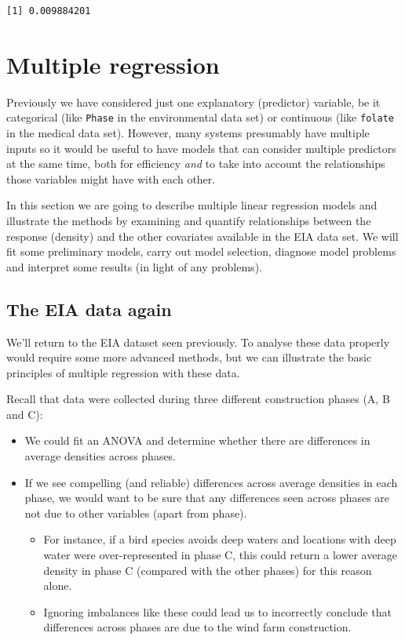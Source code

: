 \documentclass[
  oneside]{krantz}
\begin{document}
\begin{verbatim}
[1] 0.009884201
\end{verbatim}

\hypertarget{multiple-regression}{%
\section{Multiple regression}\label{multiple-regression}}

Previously we have considered just one explanatory (predictor) variable, be it categorical (like \texttt{Phase} in the environmental data set) or continuous (like \texttt{folate} in the medical data set). However, many systems presumably have multiple inputs so it would be useful to have models that can consider multiple predictors at the same time, both for efficiency \emph{and} to take into account the relationships those variables might have with each other.

In this section we are going to describe multiple linear regression models and illustrate the methods by examining and quantify relationships between the response (density) and the other covariates available in the EIA data set.
We will fit some preliminary models, carry out model selection, diagnose model problems and interpret some results (in light of any problems).

\hypertarget{the-eia-data-again}{%
\subsection{The EIA data again}\label{the-eia-data-again}}

We'll return to the EIA dataset seen previously. To analyse these data properly would require some more advanced methods, but we can illustrate the basic principles of multiple regression with these data.

Recall that data were collected during three different construction phases (A, B and C):

\begin{itemize}
\item
  We could fit an ANOVA and determine whether there are differences in average densities across phases.
\item
  If we see compelling (and reliable) differences across average densities in each phase, we would want to be sure that any differences seen across phases are not due to other variables (apart from phase).

  \begin{itemize}
  \item
    For instance, if a bird species avoids deep waters and locations with deep water were over-represented in phase C, this could return a lower average density in phase C (compared with the other phases) for this reason alone.
  \item
    Ignoring imbalances like these could lead us to incorrectly conclude that differences across phases are due to the wind farm construction.
  \end{itemize}
\end{itemize}
\end{document}
